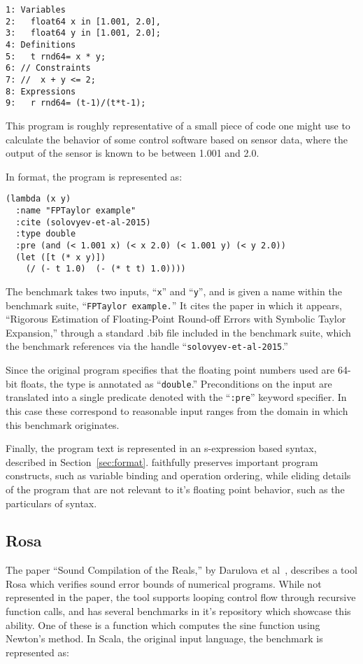 \documentclass[main.tex]{subfiles}
\begin{document}
\begin{verbatim}
1: Variables
2:   float64 x in [1.001, 2.0],
3:   float64 y in [1.001, 2.0];
4: Definitions
5:   t rnd64= x * y;
6: // Constraints
7: //  x + y <= 2;
8: Expressions
9:   r rnd64= (t-1)/(t*t-1);
\end{verbatim}

This program is roughly representative of a small piece of code one
might use to calculate the behavior of some control software based on
sensor data, where the output of the sensor is known to be between
1.001 and 2.0.

In \core format, the program is represented as:

\begin{verbatim}
(lambda (x y)
  :name "FPTaylor example"
  :cite (solovyev-et-al-2015)
  :type double
  :pre (and (< 1.001 x) (< x 2.0) (< 1.001 y) (< y 2.0))
  (let ([t (* x y)])
    (/ (- t 1.0)  (- (* t t) 1.0))))
\end{verbatim}

The benchmark takes two inputs, ``\verb|x|'' and ``\verb|y|'', and is
given a name within the benchmark suite, ``\verb|FPTaylor example.|''
It cites the paper in which it appears, ``Rigorous Estimation of
Floating-Point Round-off Errors with Symbolic Taylor Expansion,''
through a standard .bib file included in the benchmark suite, which
the benchmark references via the handle
``\verb|solovyev-et-al-2015|.''

Since the original program specifies that the floating point numbers
used are 64-bit floats, the type is annotated as ``\verb|double|.''
Preconditions on the input are translated into a single predicate
denoted with the ``\verb|:pre|'' keyword specifier. In this case these
correspond to reasonable input ranges from the domain in which this
benchmark originates.

Finally, the program text is represented in \core an s-expression
based syntax, described in Section~\ref{sec:format}. \core faithfully
preserves important program constructs, such as variable binding and
operation ordering, while eliding details of the program that are not
relevant to it's floating point behavior, such as the particulars of
syntax.

\subsection{Rosa}
The paper ``Sound Compilation of the Reals,'' by Darulova et
al~\cite{DarulovaK14}, describes a tool Rosa which verifies sound
error bounds of numerical programs. While not represented in the
paper, the tool supports looping control flow through recursive
function calls, and has several benchmarks in it's repository which
showcase this ability. One of these is a function which computes the
sine function using Newton's method. In Scala, the original input
language, the benchmark is represented as:
\end{document}
